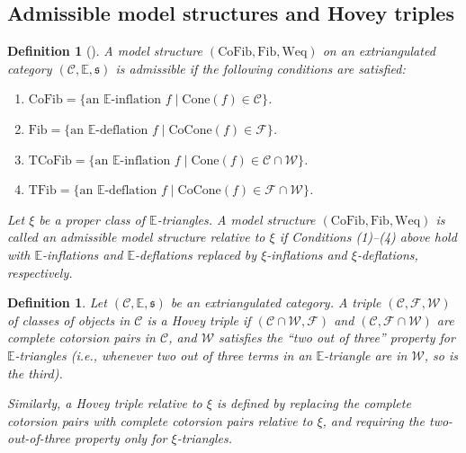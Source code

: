 \documentclass[11pt,a4paper]{amsart}
\numberwithin{equation}{section}
\theoremstyle{plain}
\newtheorem{definition}[thm]{Definition}
\begin{document}
\subsection{Admissible model structures and Hovey triples}

\begin{definition}[{\cite[Definition 5.5]{NP}}] 
	A model structure $(\mathrm{CoFib}, \mathrm{Fib}, \mathrm{Weq})$ on an extriangulated category $(\mathscr{C},\mathbb{E}, \mathfrak{s})$ is \emph{admissible} if the following conditions are satisfied:
	\begin{enumerate}
		\item[(1)] $\mathrm{CoFib}=\{ \text{an } \mathbb{E}\text{-inflation } f \mid \mathrm{Cone}(f)\in \mathcal{C} \}$.
		\item[(2)] $\mathrm{Fib}=\{ \text{an } \mathbb{E}\text{-deflation } f \mid \mathrm{CoCone}(f)\in \mathcal{F} \}$.
		\item[(3)] $\mathrm{TCoFib}=\{ \text{an } \mathbb{E}\text{-inflation } f \mid \mathrm{Cone}(f)\in \mathcal{C}\cap \mathcal{W} \}$.
		\item[(4)] $\mathrm{TFib}=\{ \text{an } \mathbb{E}\text{-deflation } f \mid \mathrm{CoCone}(f)\in \mathcal{F}\cap \mathcal{W} \}$.
	\end{enumerate}
	Let $\xi$ be a proper class of $\mathbb{E}$-triangles. A model structure $(\mathrm{CoFib},\mathrm{Fib},\mathrm{Weq})$ is called an \emph{admissible model structure relative to $\xi$} if Conditions (1)--(4) above hold with $\mathbb{E}$-inflations and $\mathbb{E}$-deflations replaced by $\xi$-inflations and $\xi$-deflations, respectively.
\end{definition}

\begin{definition}
	Let $(\mathscr{C},\mathbb{E}, \mathfrak{s})$ be an extriangulated category. A triple $(\mathcal{C}, \mathcal{F}, \mathcal{W})$ of classes of objects in $\mathscr{C}$ is a \emph{Hovey triple} if $(\mathcal{C}\cap \mathcal{W}, \mathcal{F})$ and $(\mathcal{C}, \mathcal{F}\cap \mathcal{W})$ are complete cotorsion pairs in $\mathscr{C}$, and $\mathcal{W}$ satisfies the ``two out of three'' property for $\mathbb{E}$-triangles (i.e., whenever two out of three terms in an $\mathbb{E}$-triangle are in $\mathcal{W}$, so is the third).
	
	Similarly, a \emph{Hovey triple relative to $\xi$} is defined by replacing the complete cotorsion pairs with complete cotorsion pairs relative to $\xi$, and requiring the two-out-of-three property only for $\xi$-triangles.
\end{definition}
\end{document}
